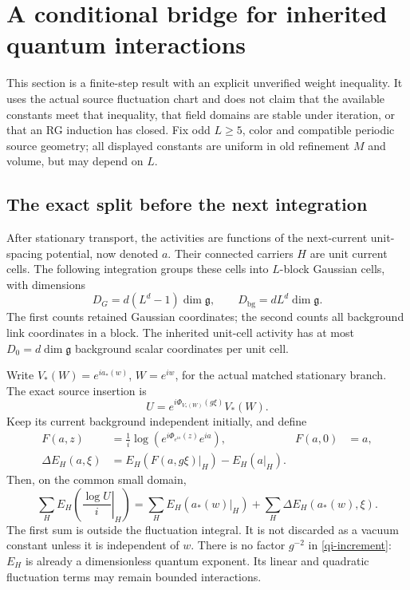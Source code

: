 \section{A conditional bridge for inherited quantum interactions}
\label{qi-section}

This section is a finite-step result with an explicit unverified
weight inequality. It uses the actual source fluctuation chart and
does not claim that the available constants meet that inequality,
that field domains are stable under iteration, or that an RG
induction has closed. Fix odd $L\ge5$, color and compatible periodic source
geometry; all displayed constants are uniform in old refinement
$M$ and volume, but may depend on $L$.

\subsection{The exact split before the next integration}

After stationary transport, the activities are functions of the
next-current unit-spacing potential, now denoted $a$. Their
connected carriers $H$ are unit current cells. The following
integration groups these cells into $L$-block Gaussian cells,
with dimensions
\begin{equation}\label{qi-dimensions}
 D_G=d(L^d-1)\dim\mathfrak g,\qquad
 D_{\mathrm{bg}}=dL^d\dim\mathfrak g.
\end{equation}
The first counts retained Gaussian coordinates; the second counts
all background link coordinates in a block. The inherited unit-cell
activity has at most $D_0=d\dim\mathfrak g$ background scalar
coordinates per unit cell.

Write $V_*(W)=e^{ia_*(w)}$, $W=e^{iw}$, for the actual matched
stationary branch. The exact source insertion is
\begin{equation}\label{qi-actual-insertion}
 U=e^{i\Phi_{V_*(W)}(g\xi)}V_*(W).
\end{equation}
Keep its current background independent initially, and define
\begin{align}
 F(a,z)&=\frac1i\log\left(e^{i\Phi_{e^{ia}}(z)}e^{ia}\right),
 &F(a,0)&=a,                                            \label{qi-map}\\
 \Delta E_H(a,\xi)&=E_H(F(a,g\xi)|_H)-E_H(a|_H).         \label{qi-increment}
\end{align}
Then, on the common small domain,
\begin{equation}\label{qi-exact-split}
 \sum_H E_H\left(\left.\frac{\log U}{i}\right|_H\right)
 =\sum_H E_H(a_*(w)|_H)
       +\sum_H\Delta E_H(a_*(w),\xi).
\end{equation}
The first sum is outside the fluctuation integral. It is not
discarded as a vacuum constant unless it is independent of $w$.
There is no factor $g^{-2}$ in \eqref{qi-increment}: $E_H$ is
already a dimensionless quantum exponent. Its linear and
quadratic fluctuation terms may remain bounded interactions.

